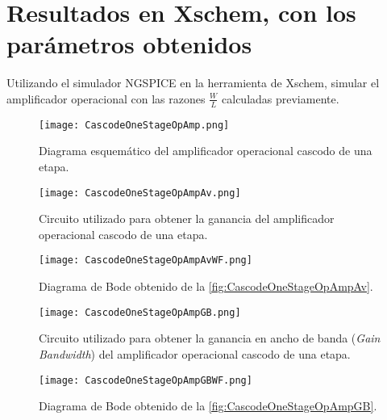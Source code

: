 \section{Resultados en Xschem, con los parámetros obtenidos \label{sec:s2}}

\begin{center}
	\begin{minipage}{12cm}
		\begin{tcolorbox}[title=Actividad 2]
			Utilizando el simulador NGSPICE en la herramienta de Xschem, simular el amplificador operacional con las razones $\frac{W}{L}$ calculadas previamente.
		\end{tcolorbox}	
	\end{minipage}
\end{center}

\begin{figure}[ht]
	\centering
	\texttt{[image: CascodeOneStageOpAmp.png]}
	\caption{Diagrama esquemático del amplificador operacional cascodo de una etapa. \label{fig:CascodeOneStageOpAmp}}
\end{figure}

\begin{figure}[ht]
	\centering
	\texttt{[image: CascodeOneStageOpAmpAv.png]}
	\caption{Circuito utilizado para obtener la ganancia del amplificador operacional cascodo de una etapa. \label{fig:CascodeOneStageOpAmpAv}}
\end{figure}

\begin{figure}[ht]
	\centering
	\texttt{[image: CascodeOneStageOpAmpAvWF.png]}
	\caption{Diagrama de Bode obtenido de la \autoref{fig:CascodeOneStageOpAmpAv}. \label{fig:CascodeOneStageOpAmpAvWF}}
\end{figure}

\begin{figure}[ht]
	\centering
	\texttt{[image: CascodeOneStageOpAmpGB.png]}
	\caption{Circuito utilizado para obtener la ganancia en ancho de banda (\textit{Gain Bandwidth}) del amplificador operacional cascodo de una etapa. \label{fig:CascodeOneStageOpAmpGB}}
\end{figure}

\begin{figure}[ht]
	\centering
	\texttt{[image: CascodeOneStageOpAmpGBWF.png]}
	\caption{Diagrama de Bode obtenido de la \autoref{fig:CascodeOneStageOpAmpGB}. \label{fig:CascodeOneStageOpAmpGBWF}}
\end{figure}

